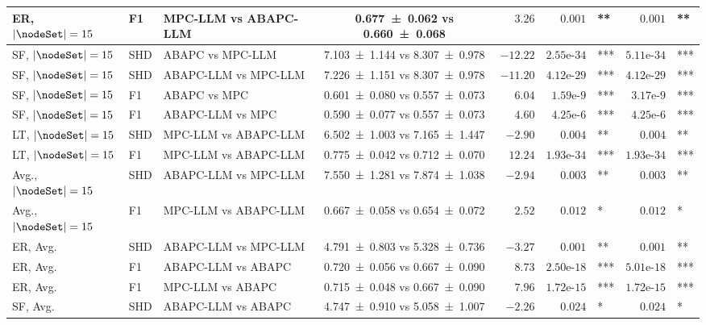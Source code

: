 \begin{table}[t]
{\begin{tabular}{ll l|c|r|rl|rl}
    ER, $|\nodeSet|=15$ & F1 & MPC-LLM vs ABAPC-LLM & \num{0.677 +- 0.062} vs \num{0.660 +- 0.068} & $3.26$ & $0.001$ & \!\!\!** & $0.001$ & \!\!\!** \\
    \midrule
    SF, $|\nodeSet|=15$ & SHD & ABAPC vs MPC-LLM & \num{7.103 +- 1.144} vs \num{8.307 +- 0.978} & $-12.22$ & $2.55\text{e-}34$ & \!\!\!*** & $5.11\text{e-}34$ & \!\!\!*** \\
    SF, $|\nodeSet|=15$ & SHD & ABAPC-LLM vs MPC-LLM & \num{7.226 +- 1.151} vs \num{8.307 +- 0.978} & $-11.20$ & $4.12\text{e-}29$ & \!\!\!*** & $4.12\text{e-}29$ & \!\!\!*** \\
    SF, $|\nodeSet|=15$ & F1 & ABAPC vs MPC & \num{0.601 +- 0.080} vs \num{0.557 +- 0.073} & $6.04$ & $1.59\text{e-}9$ & \!\!\!*** & $3.17\text{e-}9$ & \!\!\!*** \\
    SF, $|\nodeSet|=15$ & F1 & ABAPC-LLM vs MPC & \num{0.590 +- 0.077} vs \num{0.557 +- 0.073} & $4.60$ & $4.25\text{e-}6$ & \!\!\!*** & $4.25\text{e-}6$ & \!\!\!*** \\
    \midrule
    LT, $|\nodeSet|=15$ & SHD & MPC-LLM vs ABAPC-LLM & \num{6.502 +- 1.003} vs \num{7.165 +- 1.447} & $-2.90$ & $0.004$ & \!\!\!** & $0.004$ & \!\!\!** \\
    LT, $|\nodeSet|=15$ & F1 & MPC-LLM vs ABAPC-LLM & \num{0.775 +- 0.042} vs \num{0.712 +- 0.070} & $12.24$ & $1.93\text{e-}34$ & \!\!\!*** & $1.93\text{e-}34$ & \!\!\!*** \\
    \midrule
    Avg., $|\nodeSet|=15$ & SHD & ABAPC-LLM vs MPC-LLM & \num{7.550 +- 1.281} vs \num{7.874 +- 1.038} & $-2.94$ & $0.003$ & \!\!\!** & $0.003$ & \!\!\!** \\
    Avg., $|\nodeSet|=15$ & F1 & MPC-LLM vs ABAPC-LLM & \num{0.667 +- 0.058} vs \num{0.654 +- 0.072} & $2.52$ & $0.012$ & \!\!\!* & $0.012$ & \!\!\!* \\
    \midrule
    ER, Avg. & SHD & ABAPC-LLM vs MPC-LLM & \num{4.791 +- 0.803} vs \num{5.328 +- 0.736} & $-3.27$ & $0.001$ & \!\!\!** & $0.001$ & \!\!\!** \\
    ER, Avg. & F1 & ABAPC-LLM vs ABAPC & \num{0.720 +- 0.056} vs \num{0.667 +- 0.090} & $8.73$ & $2.50\text{e-}18$ & \!\!\!*** & $5.01\text{e-}18$ & \!\!\!*** \\
    ER, Avg. & F1 & MPC-LLM vs ABAPC & \num{0.715 +- 0.048} vs \num{0.667 +- 0.090} & $7.96$ & $1.72\text{e-}15$ & \!\!\!*** & $1.72\text{e-}15$ & \!\!\!*** \\
    \midrule
    SF, Avg. & SHD & ABAPC-LLM vs ABAPC & \num{4.747 +- 0.910} vs \num{5.058 +- 1.007} & $-2.26$ & $0.024$ & \!\!\!* & $0.024$ & \!\!\!* \\

\end{tabular}}
\end{table}
